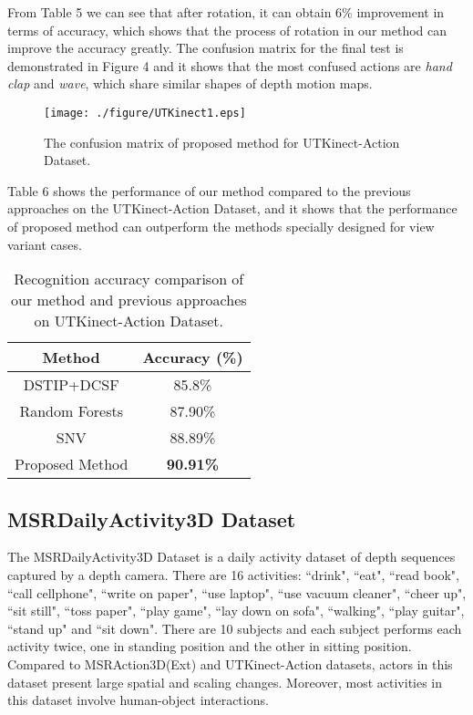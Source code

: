 \documentclass[conference]{IEEEtran}
\begin{document}
From Table 5 we can see that after rotation, it can obtain 6\% improvement in terms of accuracy, which shows that the process of rotation in our method can improve the accuracy greatly. The confusion matrix for the final test is demonstrated in Figure 4 and it shows that the most confused actions are \textit{hand clap} and \textit{ wave}, which share similar shapes of depth motion maps.
\begin{figure}[!ht]
\begin{center}{\texttt{[image: ./figure/UTKinect1.eps]}}
\end{center}
\caption{The confusion matrix of proposed method for UTKinect-Action Dataset.}
\label{fig:framework}
\end{figure}

Table 6 shows the performance of our method compared to the previous approaches on the UTKinect-Action Dataset, and it shows that the performance of proposed method can outperform the methods specially designed for view variant cases.

\begin{table}[h]
\centering
\caption{Recognition accuracy comparison of our method and previous approaches on  UTKinect-Action Dataset.}
\begin{tabular}{|c|c|}
\hline
Method & Accuracy (\%)\\
\hline
DSTIP+DCSF \cite{xia2013spatio} & 85.8\%  \\
\hline
Random Forests \cite{zhu2013fusing} & 87.90\%  \\
\hline
SNV \cite{yangsuper} & 88.89\%  \\
\hline
Proposed Method & \textbf{90.91\%}  \\
\hline
\end{tabular}
\end{table}





\subsection{MSRDailyActivity3D Dataset}
The MSRDailyActivity3D Dataset \cite{wang2012mining} is a daily activity dataset of depth sequences captured by a depth camera. There are 16 activities: ``drink", ``eat", ``read book", ``call cellphone", ``write on paper", ``use laptop", ``use vacuum cleaner", ``cheer up", ``sit still", ``toss paper", ``play game", ``lay down on sofa", ``walking", ``play guitar", ``stand up" and ``sit down". There are 10 subjects and each subject performs each activity twice, one in standing position and the other in sitting position. Compared to MSRAction3D(Ext) and UTKinect-Action datasets, actors in this dataset present large spatial and scaling changes. Moreover, most activities in this dataset involve human-object interactions.
\end{document}
